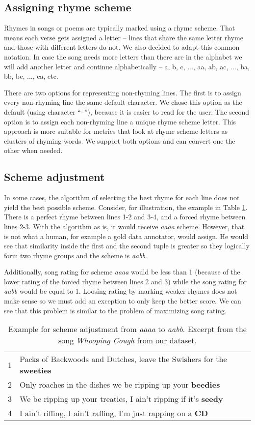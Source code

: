 \subsection{Assigning rhyme scheme}
 Rhymes in songs or poems are typically marked using a rhyme scheme. That means each verse gets assigned a letter -- lines that share the same letter rhyme and those with different letters do not. We also decided to adapt this common notation. In case the song needs more letters than there are in the alphabet we will add another letter and continue alphabetically -- a, b, c, ..., aa, ab, ac, ..., ba, bb, bc, ..., ca, etc.
 
 There are two options for representing non-rhyming lines. The first is to assign every non-rhyming line the same default character. We chose this option as the default (using character ``--''), because it is easier to read for the user. The second option is to assign each non-rhyming line a unique rhyme scheme letter. This approach is more suitable for metrics that look at rhyme scheme letters as clusters of rhyming words. We support both options and can convert one the other when needed.

\subsection{Scheme adjustment}
In some cases, the algorithm of selecting the best rhyme for each line does not yield the best possible scheme. Consider, for illustration, the example in Table \ref{scheme_adjustment}. There is a perfect rhyme between lines 1-2 and 3-4, and a forced rhyme between lines 2-3. With the algorithm as is, it would receive \textit{aaaa} scheme. However, that is not what a human, for example a gold data annotator, would assign. He would see that similarity inside the first and the second tuple is greater so they logically form two rhyme groups and the scheme is \textit{aabb}. 

Additionally, song rating for scheme \textit{aaaa} would be less than 1 (because of the lower rating of the forced rhyme between lines 2 and 3) while the song rating for \textit{aabb} would be equal to 1. Loosing rating by marking weaker rhymes does not make sense so we must add an exception to only keep the better score. We can see that this problem is similar to the problem of maximizing song rating. 

\begin{table}
	\begin{tabular}{l l}
		1&Packs of Backwoods and Dutches, leave the Swishers for the \textbf{sweeties}  \\
		2&Only roaches in the dishes we be ripping up your \textbf{beedies}  \\
		3&We be ripping up your treaties, I ain't ripping if it's \textbf{seedy}  \\
		4&I ain't riffing, I ain't raffing, I'm just rapping on a \textbf{CD} \\
	\end{tabular}
	\caption[Scheme adjustment example.]{Example for scheme adjustment from \textit{aaaa} to \textit{aabb}. Excerpt from the song \textit{Whooping Cough} from  our dataset.}
	\label{scheme_adjustment}
\end{table}

